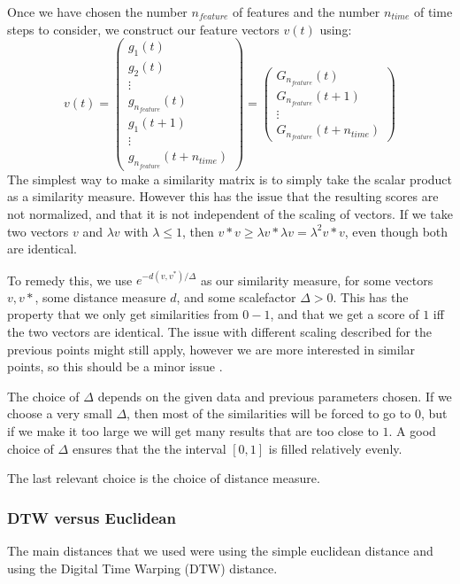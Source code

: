 Once we have chosen the number $n_{feature}$ of features and the number $n_{time}$ of time steps to consider, we construct our feature vectors $v(t)$ using:
\[
v(t)= \left (
\begin{matrix}
g_1(t) \\
g_2(t) \\
\vdots \\
g_{n_{feature}}(t) \\
g_{1}(t+1) \\
\vdots \\
g_{n_{feature}}(t+n_{time})
\end{matrix}
\right ) = \left (
\begin{matrix}
G_{n_{feature}}(t) \\
G_{n_{feature}}(t+1) \\
\vdots \\
G_{n_{feature}}(t+n_{time})
\end{matrix}
\right )
\]
The simplest way to make a similarity matrix is to simply take the scalar product as a similarity measure. However this has the issue that the resulting scores are not normalized, and that it is not independent of the scaling of vectors. If we take two vectors $v$ and $\lambda v$ with $\lambda \leq 1$, then $v*v \geq \lambda v* \lambda v=\lambda^2 v*v$, even though both are identical. 

To remedy this, we use $e^{-d(v,v^*)/\Delta}$ as our similarity measure, for some vectors $v,v*$, some distance measure $d$, and some scalefactor $\Delta > 0$. This has the property that we only get similarities from $0-1$, and that we get a score of $1$ iff  the two vectors are identical. The issue with different scaling described for the previous points might still apply, however we are more interested in similar points, so this should be a minor issue .

The choice of $\Delta$ depends on the given data and previous parameters chosen. If we choose a very small $\Delta$, then most of the similarities will be forced to go to $0$, but if we make it too large we will get many results that are too close to $1$. A good choice of $\Delta$ ensures that the the interval $[0,1]$ is filled relatively evenly. 

The last relevant choice is the choice of distance measure.
\subsubsection{DTW versus Euclidean}
The main distances that we used were  using the simple euclidean distance and using the Digital Time Warping (DTW) distance. 

